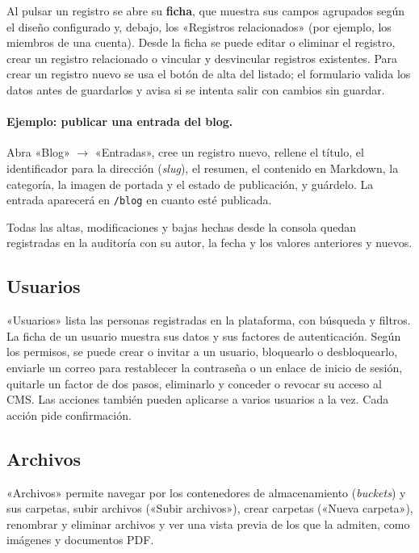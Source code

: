 Al pulsar un registro se abre su \textbf{ficha}, que muestra sus campos
agrupados según el diseño configurado y, debajo, los «Registros
relacionados» (por ejemplo, los miembros de una cuenta). Desde la ficha se
puede editar o eliminar el registro, crear un registro relacionado o vincular
y desvincular registros existentes. Para crear un registro nuevo se usa el
botón de alta del listado; el formulario valida los datos antes de guardarlos
y avisa si se intenta salir con cambios sin guardar.

\paragraph{Ejemplo: publicar una entrada del blog.}
Abra «Blog» $\rightarrow$ «Entradas», cree un registro nuevo, rellene el
título, el identificador para la dirección (\textit{slug}), el resumen, el
contenido en Markdown, la categoría, la imagen de portada y el estado de
publicación, y guárdelo. La entrada
aparecerá en \texttt{/blog} en cuanto esté publicada.

Todas las altas, modificaciones y bajas hechas desde la consola quedan
registradas en la auditoría con su autor, la fecha y los valores anteriores y
nuevos.

\subsection{Usuarios}
\label{sec:ug-usuarios}

«Usuarios» lista las personas registradas en la plataforma, con búsqueda y
filtros. La ficha de un usuario muestra sus datos y sus factores de
autenticación. Según los permisos, se puede crear o invitar a un
usuario, bloquearlo o desbloquearlo, enviarle un correo para restablecer la
contraseña o un enlace de inicio de sesión, quitarle un factor de dos pasos,
eliminarlo y conceder o revocar su acceso al CMS. Las acciones también pueden
aplicarse a varios usuarios a la vez. Cada acción pide confirmación.

\subsection{Archivos}
\label{sec:ug-archivos}

«Archivos» permite navegar por los contenedores de almacenamiento
(\textit{buckets}) y sus carpetas, subir archivos («Subir archivos»), crear
carpetas («Nueva carpeta»), renombrar y eliminar archivos y ver una vista
previa de los que la admiten, como imágenes y documentos PDF.

